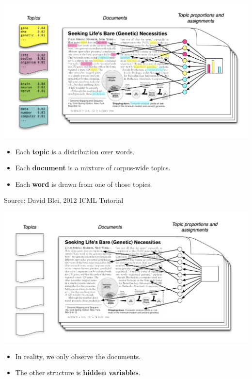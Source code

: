 \documentclass[10pt]{beamer}
\begin{document}
\begin{frame}

\begin{center}
\includegraphics[width=\textwidth]{images/lda_intro}
\end{center}


\begin{itemize}
\item Each \textbf{topic} is a distribution over words. \pause
\item Each \textbf{document} is a mixture of corpus-wide topics. \pause
\item Each \textbf{word} is drawn from one of those topics.
\end{itemize}

\hfill \tiny Source: David Blei, 2012 ICML Tutorial \normalsize
\end{frame}

\begin{frame}

\begin{center}
\includegraphics[width=\textwidth]{images/lda_intro_2}
\end{center}


\begin{itemize}
\item In reality, we only observe the documents. 
\item The other structure is \textbf{hidden variables}.
\end{itemize}

\end{frame}
\end{document}
